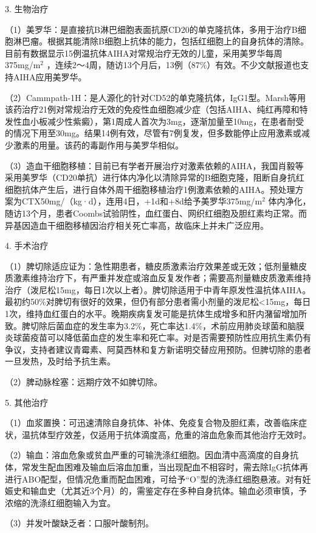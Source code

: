 3. 生物治疗

（1）美罗华：是直接抗B淋巴细胞表面抗原CD20的单克隆抗体，多用于治疗B细胞淋巴瘤。根据其能清除B细胞上抗体的能力，包括红细胞上的自身抗体的清除。目前有数据显示15例温抗体AIHA对常规治疗无效的儿童，采用美罗华每周375mg/m$^2$
，连续2～4周，随访13个月后，13例（87\%）有效。不少文献报道也支持AIHA应用美罗华。

（2）Cammpath-1H：是人源化的针对CD52的单克隆抗体，IgG1型。Marsh等用该药治疗21例对常规治疗无效的免疫性血细胞减少症（包括AIHA、纯红再障和特发性血小板减少性紫癜），第1周成人首次为3mg，逐渐加量至10mg，在患者耐受的情况下用至30mg。结果14例有效，尽管有7例复发，但多数能停止应用激素或减少激素的用量。该药的毒副作用与美罗华相似。

（3）造血干细胞移植：目前已有学者开展治疗对激素依赖的AIHA，我国肖毅等采用美罗华（CD20单抗）进行体内净化以清除异常的B细胞克隆，阻断自身抗红细胞抗体产生后，进行自体外周干细胞移植治疗1例激素依赖的AIHA。预处理方案为CTX50mg/（kg·d），连用4日，+1d和+8d给予美罗华375mg/m$^2$
体内净化，随访13个月，患者Coombs试验阴性，血红蛋白、网织红细胞及胆红素均正常。而异基因造血干细胞移植因治疗相关死亡率高，故临床上并未广泛应用。

4. 手术治疗

（1）脾切除适应证为：急性期患者，糖皮质激素治疗效果差或无效；低剂量糖皮质激素维持治疗下，有严重并发症或溶血反复发作者；需要高剂量糖皮质激素维持治疗（泼尼松15mg，每日1次以上者）。脾切除适用于中青年原发性温抗体AIHA。最初约50\%对脾切有很好的效果，但仍有部分患者需小剂量的泼尼松<15mg，每日1次，维持血红蛋白的水平。晚期疾病复发可能是抗体生成增多和肝内潴留增加所致。脾切除后菌血症的发生率为3.2\%，死亡率达1.4\%，术前应用肺炎球菌和脑膜炎球菌疫苗可以降低菌血症的发生率和死亡率。对是否需要预防性应用抗生素仍有争议，支持者建议青霉素、阿莫西林和复方新诺明交替应用预防。但脾切除的患者一旦发热，及时给予抗生素。

（2）脾动脉栓塞：远期疗效不如脾切除。

5. 其他治疗

（1）血浆置换：可迅速清除自身抗体、补体、免疫复合物及胆红素，改善临床症状，温抗体型疗效差，仅适用于抗体滴度高，危重的溶血危象而其他治疗无效时。

（2）输血：溶血危象或贫血严重的可输洗涤红细胞。因血清中高滴度的自身抗体，常发生配血困难及输血后溶血加重，当出现配血不相容时，需去除IgG抗体再进行ABO配型，但情况危重而配血困难，可给予“O”型的洗涤红细胞悬液。对有妊娠史和输血史（尤其近3个月）的，需鉴定存在多种自身抗体。输血必须审慎，予浓缩的洗涤红细胞输入为宜。

（3）并发叶酸缺乏者：口服叶酸制剂。


